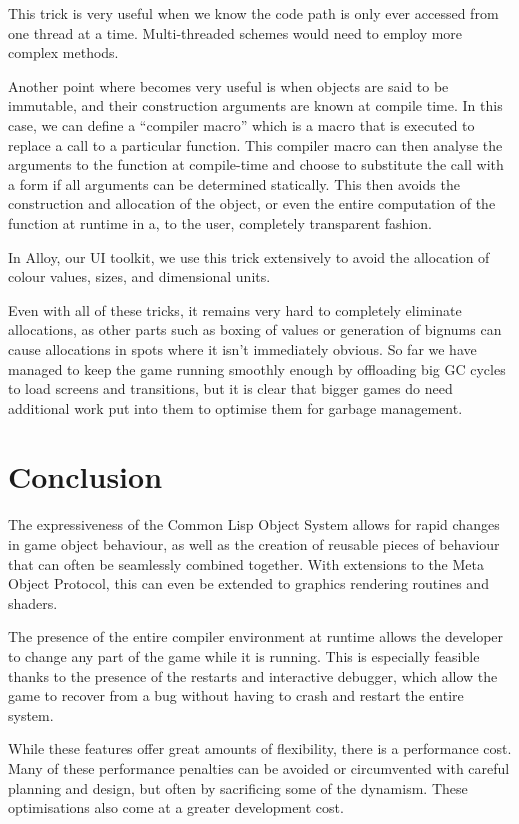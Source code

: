 \documentclass[a4paper]{paper}
\begin{document}
This trick is very useful when we know the code path is only ever accessed from one thread at a time. Multi-threaded schemes would need to employ more complex methods.

Another point where  becomes very useful is when objects are said to be immutable, and their construction arguments are known at compile time. In this case, we can define a ``compiler macro'' which is a macro that is executed to replace a call to a particular function. This compiler macro can then analyse the arguments to the function at compile-time and choose to substitute the call with a  form if all arguments can be determined statically. This then avoids the construction and allocation of the object, or even the entire computation of the function at runtime in a, to the user, completely transparent fashion.

In Alloy, our UI toolkit, we use this trick extensively to avoid the allocation of colour values, sizes, and dimensional units.

Even with all of these tricks, it remains very hard to completely eliminate allocations, as other parts such as boxing of values or generation of bignums can cause allocations in spots where it isn't immediately obvious. So far we have managed to keep the game running smoothly enough by offloading big GC cycles to load screens and transitions, but it is clear that bigger games do need additional work put into them to optimise them for garbage management.

\section{Conclusion}
The expressiveness of the Common Lisp Object System allows for rapid changes in game object behaviour, as well as the creation of reusable pieces of behaviour that can often be seamlessly combined together. With extensions to the Meta Object Protocol, this can even be extended to graphics rendering routines and shaders.

The presence of the entire compiler environment at runtime allows the developer to change any part of the game while it is running. This is especially feasible thanks to the presence of the restarts and interactive debugger, which allow the game to recover from a bug without having to crash and restart the entire system.

While these features offer great amounts of flexibility, there is a performance cost. Many of these performance penalties can be avoided or circumvented with careful planning and design, but often by sacrificing some of the dynamism. These optimisations also come at a greater development cost.
\end{document}
